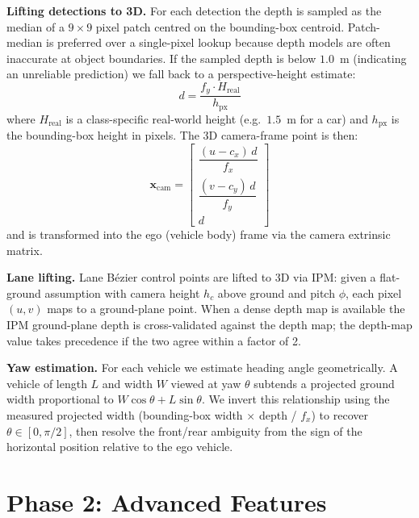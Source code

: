 \documentclass[conference]{IEEEtran}
\begin{document}
\textbf{Lifting detections to 3D.}
For each detection the depth is sampled as the median of a $9\times9$ pixel
patch centred on the bounding-box centroid.  Patch-median is preferred over
a single-pixel lookup because depth models are often inaccurate at object
boundaries.  If the sampled depth is below $1.0$~m (indicating an unreliable
prediction) we fall back to a perspective-height estimate:
\begin{equation}
  d = \frac{f_y \cdot H_{\text{real}}}{h_{\text{px}}}
\end{equation}
where $H_{\text{real}}$ is a class-specific real-world height (e.g.\
$1.5$~m for a car) and $h_{\text{px}}$ is the bounding-box height in pixels.
The 3D camera-frame point is then:
\begin{equation}
  \mathbf{x}_{\text{cam}} =
  \begin{bmatrix}
    \dfrac{(u - c_x)\,d}{f_x} \\[6pt]
    \dfrac{(v - c_y)\,d}{f_y} \\[6pt]
    d
  \end{bmatrix}
\end{equation}
and is transformed into the ego (vehicle body) frame via the camera extrinsic
matrix.

\textbf{Lane lifting.}
Lane B\'ezier control points are lifted to 3D via IPM: given a flat-ground
assumption with camera height $h_c$ above ground and pitch $\phi$, each
pixel $(u, v)$ maps to a ground-plane point.  When a dense depth map is
available the IPM ground-plane depth is cross-validated against the depth
map; the depth-map value takes precedence if the two agree within a factor
of 2.

\textbf{Yaw estimation.}
For each vehicle we estimate heading angle geometrically.  A vehicle of
length $L$ and width $W$ viewed at yaw $\theta$ subtends a projected ground
width proportional to $W\cos\theta + L\sin\theta$.  We invert this relationship
using the measured projected width (bounding-box width $\times$ depth / $f_x$)
to recover $\theta \in [0, \pi/2]$, then resolve the front/rear ambiguity
from the sign of the horizontal position relative to the ego vehicle.

\section{Phase 2: Advanced Features}
\end{document}
